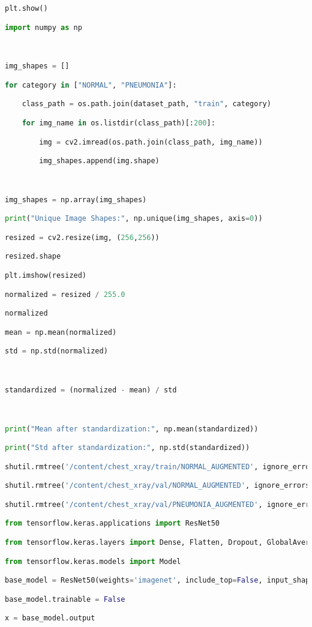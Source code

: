\documentclass{article}
\begin{document}
\begin{lstlisting}[style=mystyle,language=Python]
plt.show()

import numpy as np



img_shapes = []

for category in ["NORMAL", "PNEUMONIA"]:

    class_path = os.path.join(dataset_path, "train", category)

    for img_name in os.listdir(class_path)[:200]:

        img = cv2.imread(os.path.join(class_path, img_name))

        img_shapes.append(img.shape)



img_shapes = np.array(img_shapes)

print("Unique Image Shapes:", np.unique(img_shapes, axis=0))

resized = cv2.resize(img, (256,256))

resized.shape

plt.imshow(resized)

normalized = resized / 255.0

normalized

mean = np.mean(normalized)

std = np.std(normalized)



standardized = (normalized - mean) / std



print("Mean after standardization:", np.mean(standardized))

print("Std after standardization:", np.std(standardized))

shutil.rmtree('/content/chest_xray/train/NORMAL_AUGMENTED', ignore_errors=True)

shutil.rmtree('/content/chest_xray/val/NORMAL_AUGMENTED', ignore_errors=True)

shutil.rmtree('/content/chest_xray/val/PNEUMONIA_AUGMENTED', ignore_errors=True)

from tensorflow.keras.applications import ResNet50

from tensorflow.keras.layers import Dense, Flatten, Dropout, GlobalAveragePooling2D

from tensorflow.keras.models import Model

base_model = ResNet50(weights='imagenet', include_top=False, input_shape=(256, 256, 3))

base_model.trainable = False

x = base_model.output


\end{lstlisting}
\end{document}
